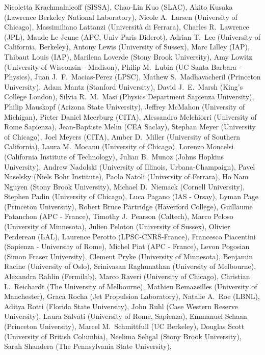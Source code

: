 Nicoletta Krachmalnicoff (SISSA),
Chao-Lin Kuo (SLAC),
Akito Kusaka (Lawrence Berkeley National Laboratory),
Nicole A.~Larsen (University of Chicago),
Massimiliano Lattanzi (Università di Ferrara),
Charles R.~Lawrence (JPL),
Maude Le Jeune (APC, Univ Paris Diderot),
Adrian T.~Lee (University of California, Berkeley),
Antony Lewis (University of Sussex),
Marc Lilley (IAP),
Thibaut Louis (IAP),
Marilena Loverde (Stony Brook University),
Amy Lowitz (University of Wisconsin - Madison),
Philip M.~Lubin (UC Santa Barbara - Physics),
Juan J.~F.~Macias-Perez (LPSC),
Mathew S.~Madhavacheril (Princeton University),
Adam Mantz (Stanford University),
David J.~E.~Marsh (King's College London),
Silvia R.~M.~Masi (Physics Department Sapienza University),
Philip Mauskopf (Arizona State University),
Jeffrey McMahon (University of Michigan),
Pieter Daniel Meerburg (CITA),
Alessandro Melchiorri (University of Rome Sapienza),
Jean-Baptiste Melin (CEA Saclay),
Stephan Meyer (University of Chicago),
Joel Meyers (CITA),
Amber D.~Miller (University of Southern California),
Laura M.~Mocanu (University of Chicago),
Lorenzo Moncelsi (California Institute of Technology),
Julian B.~Munoz (Johns Hopkins University),
Andrew Nadolski (University of Illinois, Urbana-Champaign),
Pavel Naselsky (Niels Bohr Institute),
Paolo Natoli (University of Ferrara),
Ho Nam Nguyen (Stony Brook University),
Michael D.~Niemack (Cornell University),
Stephen Padin (University of Chicago),
Luca Pagano (IAS - Orsay),
Lyman Page (Princeton University),
Robert Bruce Partridge (Haverford College),
Guillaume Patanchon (APC - France),
Timothy J.~Pearson (Caltech),
Marco Peloso (University of Minnesota),
Julien Peloton (University of Sussex),
Olivier Perdereau (LAL),
Laurence Perotto (LPSC-CNRS-France),
Francesco Piacentini (Sapienza - University of Rome),
Michel Piat (APC - France),
Levon Pogosian (Simon Fraser University),
Clement Pryke (University of Minnesota),
Benjamin Racine (University of Oslo),
Srinivasan Raghunathan (University of Melbourne),
Alexandra Rahlin (Fermilab),
Marco Raveri (University of Chicago),
Christian L.~Reichardt (The University of Melbourne),
Mathieu Remazeilles (University of Manchester),
Graca Rocha (Jet Propulsion Laboratory),
Natalie A.~Roe (LBNL),
Aditya Rotti (Florida State University),
John Ruhl (Case Western Reserve University),
Laura Salvati (University of Rome, Sapienza),
Emmanuel Schaan (Princeton University),
Marcel M.~Schmittfull (UC Berkeley),
Douglas Scott (University of British Columbia),
Neelima Sehgal (Stony Brook University),
Sarah Shandera (The Pennsylvania State University),
